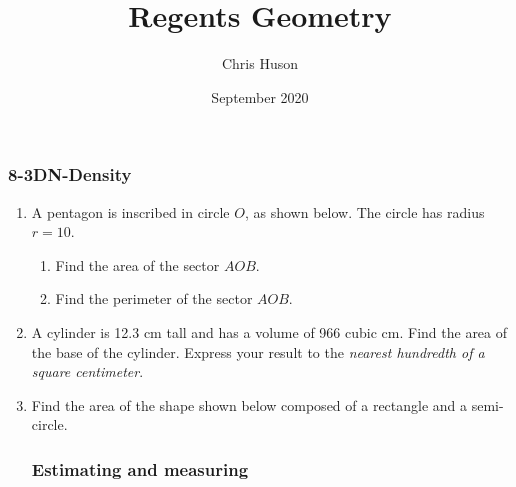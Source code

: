 \documentclass[12pt, twoside]{article}
\title{Regents Geometry}
\author{Chris Huson}
\date{September 2020}
\begin{document}
\subsubsection*{8-3DN-Density}
\begin{enumerate}
\item A pentagon is inscribed in circle $O$, as shown below. The circle has radius $r=10$.
    \begin{multicols}{2}
    \raggedcolumns
    \begin{enumerate}
      \item Find the area of the sector $AOB$. \vspace{3cm}
      \item Find the perimeter of the sector $AOB$. %
    \end{enumerate}
    \end{multicols}  \vspace{1cm}

\item A cylinder is 12.3 cm tall and has a volume of 966 cubic cm. Find the area of the base of the cylinder. Express your result to the \emph{nearest hundredth of a square centimeter}. \vspace{3cm}

\item Find the area of the shape shown below composed of a rectangle and a semi-circle.
  \begin{flushright}
\end{flushright}

\newpage
\subsubsection*{Estimating and measuring}


\end{enumerate}
\end{document}
